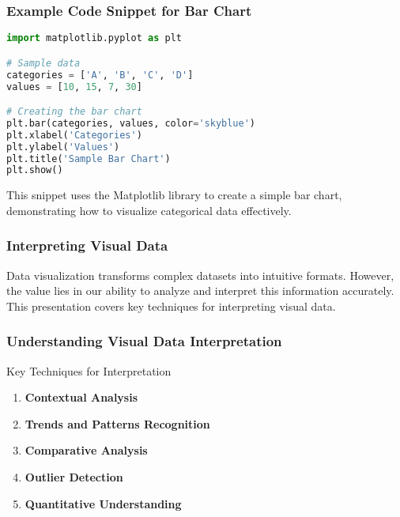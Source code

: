 \documentclass{beamer}
\begin{document}
\begin{frame}[fragile]
    \frametitle{Example Code Snippet for Bar Chart}
    \begin{lstlisting}[language=Python]
import matplotlib.pyplot as plt

# Sample data
categories = ['A', 'B', 'C', 'D']
values = [10, 15, 7, 30]

# Creating the bar chart
plt.bar(categories, values, color='skyblue')
plt.xlabel('Categories')
plt.ylabel('Values')
plt.title('Sample Bar Chart')
plt.show()
    \end{lstlisting}
    
    This snippet uses the Matplotlib library to create a simple bar chart, demonstrating how to visualize categorical data effectively.
\end{frame}

\begin{frame}[fragile]
    \frametitle{Interpreting Visual Data}
    Data visualization transforms complex datasets into intuitive formats. 
    However, the value lies in our ability to analyze and interpret this information accurately. 
    This presentation covers key techniques for interpreting visual data.
\end{frame}

\begin{frame}[fragile]
    \frametitle{Understanding Visual Data Interpretation}
    \begin{block}{Key Techniques for Interpretation}
        \begin{enumerate}
            \item \textbf{Contextual Analysis}
            \item \textbf{Trends and Patterns Recognition}
            \item \textbf{Comparative Analysis}
            \item \textbf{Outlier Detection}
            \item \textbf{Quantitative Understanding}
        \end{enumerate}
    \end{block}
\end{frame}
\end{document}
